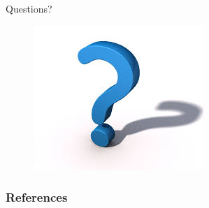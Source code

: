 \documentclass[t,14pt,mathserif]{beamer}
\begin{document}
\begin{frame}{Questions?}

	\begin{figure}[hbtp]
		\centering
	\includegraphics[scale=1]{../img/questions.jpg}
	\end{figure}
	

\end{frame}


\begin{frame}[allowframebreaks]
   \frametitle{References}
   
   
\end{frame}
\end{document}
